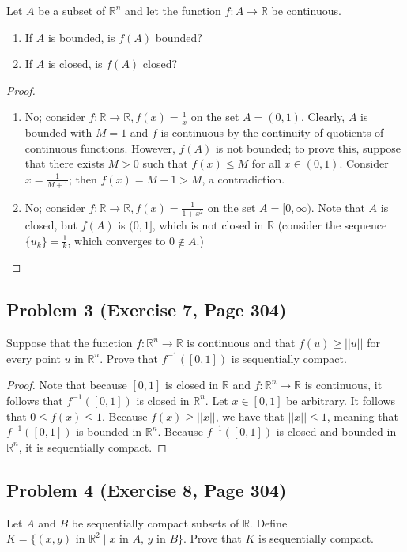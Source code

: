 \documentclass{article}
\begin{document}
Let $A$ be a subset of $\mathbb{R}^n$ and let the function $f \colon A \to \mathbb{R}$ be continuous. 
\begin{enumerate}[label = \alph*)]
\item If $A$ is bounded, is $f(A)$ bounded?
\item If $A$ is closed, is $f(A)$ closed?
\end{enumerate}

\begin{proof} \quad \\
\begin{enumerate}[label = \alph*)]
\item No; consider $f \colon \mathbb{R} \to \mathbb{R}, f(x) = \frac{1}{x}$ on the set $A = (0, 1)$. Clearly, $A$ is bounded with $M = 1$ and $f$ is continuous by the continuity of quotients of continuous functions. However, $f(A)$ is not bounded; to prove this, suppose that there exists $M > 0$ such that $f(x) \leq M$ for all $x \in (0, 1)$. Consider $x = \frac{1}{M+1}$; then $f(x) = M+1 > M$, a contradiction.
\item No; consider $f \colon \mathbb{R} \to \mathbb{R}, f(x) = \frac{1}{1+x^2}$ on the set $A = [0, \infty)$. Note that $A$ is closed, but $f(A)$ is $(0, 1]$, which is not closed in $\mathbb{R}$ (consider the sequence $\{u_k\} = \frac{1}{k}$, which converges to $0 \notin A$.)
\end{enumerate}
\end{proof}

\subsection*{Problem 3 (Exercise 7, Page 304)}
Suppose that the function $f \colon \mathbb{R}^n \to \mathbb{R}$ is continuous and that $f(u) \geq ||u||$ for every point $u$ in $\mathbb{R}^n$. Prove that $f^{-1}([0, 1])$ is sequentially compact.

\begin{proof}
Note that because $[0, 1]$ is closed in $\mathbb{R}$ and $f \colon \mathbb{R}^n \to \mathbb{R}$ is continuous, it follows that $f^{-1}([0, 1])$ is closed in $\mathbb{R}^n$. Let $x \in [0, 1]$ be arbitrary. It follows that $0 \leq f(x) \leq 1$. Because $f(x) \geq ||x||$, we have that $||x|| \leq 1$, meaning that $f^{-1}([0, 1])$ is bounded in $\mathbb{R}^n$. Because $f^{-1}([0, 1])$ is closed and bounded in $\mathbb{R}^n$, it is sequentially compact.
\end{proof}

\subsection*{Problem 4 (Exercise 8, Page 304)}
Let $A$ and $B$ be sequentially compact subsets of $\mathbb{R}$. Define $K = \{(x, y) \text{ in } \mathbb{R}^2 \mid x \text{ in } A,\, y \text{ in } B\}$. Prove that $K$ is sequentially compact.
\end{document}
